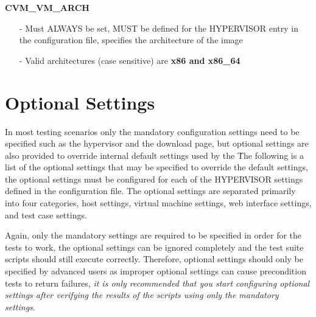 \begin{description}
\item {\bf CVM\_VM\_ARCH}
		\begin{itemize}
		\item[-]	Must ALWAYS be set, MUST be defined for the HYPERVISOR entry in the configuration
				file, specifies the architecture of the \cernvm image
		\item[-]	Valid architectures (case sensitive) are {\bf x86 and x86\_64}
		\end{itemize}


\end{description}




\section{Optional Settings}
\label{sec:optionalsettings}

In most testing scenarios only the mandatory configuration settings need to be specified such as the hypervisor and 
the download page, but optional settings are also provided to override internal default settings used by the 
\cernvmtestframework\. The following is a list of the optional settings that may be specified to override the default
settings, the optional settings must be configured for each of the HYPERVISOR settings defined in the configuration file.
The optional settings are separated primarily into four categories, host settings, virtual machine settings, web interface
settings, and test case settings. 

Again, only the mandatory settings are required to be specified in order for the tests to work, the optional settings 
can be ignored completely and the test suite scripts should still execute correctly. Therefore, optional settings should
only be specified by advanced users as improper optional settings can cause precondition tests to return failures,
\emph{it is only recommended that you start configuring optional settings after verifying the results of the scripts 
using only the mandatory settings}.


